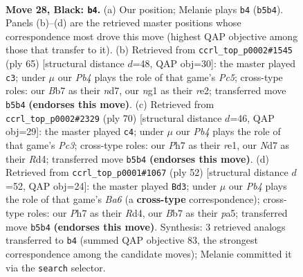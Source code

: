 \documentclass[11pt]{article}
\begin{document}
\clearpage

\begin{figure}[p]\centering
\begin{subfigure}{0.46\textwidth}\centering
\resizebox{\linewidth}{!}{%
\newchessgame
\chessboard[
  setfen={7k/1b1n1p1p/5rp1/Rp1Pp3/4P3/1r3PP1/7P/4K1NR b - - 0 28},
  showmover=false,
  pgfstyle=straightmove, color=movearrow, markmove={b5-b4}
]}
\caption{}
\end{subfigure}\hfill
\begin{subfigure}{0.46\textwidth}\centering
\resizebox{\linewidth}{!}{%
\newchessgame
\chessboard[
  setfen={8/pk1N4/2n5/2pp1r2/Pppr3P/6P1/1P2RPK1/2R5 b - - 7 33},
  showmover=false,
  pgfstyle=straightmove, color=movearrow, markmove={c4-c3}
]}
\caption{}
\end{subfigure}
\\[4pt]
\begin{subfigure}{0.46\textwidth}\centering
\resizebox{\linewidth}{!}{%
\newchessgame
\chessboard[
  setfen={5k2/1pr2p1b/p2p2p1/3B3p/3R1P1P/KPP3R1/P7/4r3 w - - 8 36},
  showmover=false,
  pgfstyle=straightmove, color=movearrow, markmove={c3-c4}
]}
\caption{}
\end{subfigure}\hfill
\begin{subfigure}{0.46\textwidth}\centering
\resizebox{\linewidth}{!}{%
\newchessgame
\chessboard[
  setfen={r4k2/5p1p/Bp3np1/p7/PP1R4/6P1/2r2P1P/1R4K1 w - - 1 27},
  showmover=false,
  pgfstyle=straightmove, color=movearrow, markmove={a6-d3}
]}
\caption{}
\end{subfigure}
\caption{\textbf{Move 28, Black: \texttt{b4}.} (a) Our position; Melanie plays \texttt{b4} (\texttt{b5b4}). Panels (b)--(d) are the retrieved master positions whose correspondence most drove this move (highest QAP objective among those that transfer to it). (b) Retrieved from \texttt{ccrl\_top\_p0002\#1545} (ply 65) [structural distance $d$=48, QAP obj=30]: the master played \texttt{c3}; under $\mu$ our \emph{Pb4} plays the role of that game's \emph{Pc5}; cross-type roles: our \emph{B}b7 as their \emph{n}d7, our \emph{n}g1 as their \emph{r}e2; transferred move \texttt{b5b4} \textbf{(endorses this move)}. (c) Retrieved from \texttt{ccrl\_top\_p0002\#2329} (ply 70) [structural distance $d$=46, QAP obj=29]: the master played \texttt{c4}; under $\mu$ our \emph{Pb4} plays the role of that game's \emph{Pc3}; cross-type roles: our \emph{P}h7 as their \emph{r}e1, our \emph{N}d7 as their \emph{R}d4; transferred move \texttt{b5b4} \textbf{(endorses this move)}. (d) Retrieved from \texttt{ccrl\_top\_p0001\#1067} (ply 52) [structural distance $d$=52, QAP obj=24]: the master played \texttt{Bd3}; under $\mu$ our \emph{Pb4} plays the role of that game's \emph{Ba6} (a \textbf{cross-type} correspondence); cross-type roles: our \emph{P}h7 as their \emph{R}d4, our \emph{B}b7 as their \emph{p}a5; transferred move \texttt{b5b4} \textbf{(endorses this move)}. Synthesis: 3 retrieved analogs transferred to \texttt{b4} (summed QAP objective 83, the strongest correspondence among the candidate moves); Melanie committed it via the \texttt{search} selector.}
\label{fig:thought-m55}
\end{figure}
\end{document}
